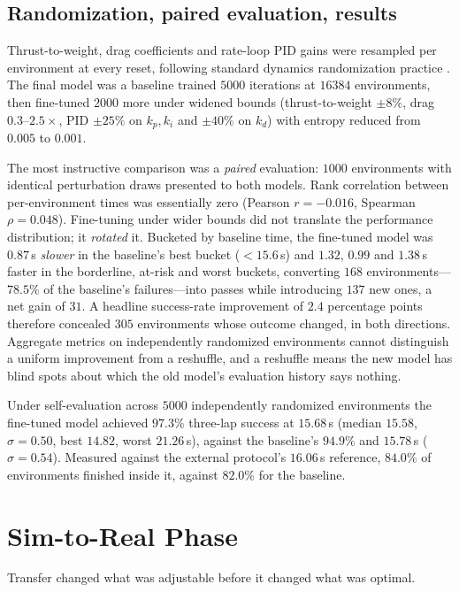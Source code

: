 \documentclass[10pt, twocolumn]{article}
\begin{document}
\subsection{Randomization, paired evaluation, results}

Thrust-to-weight, drag coefficients and rate-loop PID gains were resampled per
environment at every reset, following standard dynamics randomization practice
\cite{tobin2017,peng2018}. The final model was a baseline trained $5000$
iterations at $16384$ environments, then fine-tuned $2000$ more under widened
bounds (thrust-to-weight $\pm8\%$, drag $0.3$--$2.5\times$, PID $\pm25\%$ on
$k_p,k_i$ and $\pm40\%$ on $k_d$) with entropy reduced from $0.005$ to $0.001$.

The most instructive comparison was a \emph{paired} evaluation: $1000$
environments with identical perturbation draws presented to both models. Rank
correlation between per-environment times was essentially zero (Pearson
$r = -0.016$, Spearman $\rho = 0.048$). Fine-tuning under wider bounds did not
translate the performance distribution; it \emph{rotated} it. Bucketed by
baseline time, the fine-tuned model was $0.87$\,s \emph{slower} in the
baseline's best bucket ($<15.6$\,s) and $1.32$, $0.99$ and $1.38$\,s faster in
the borderline, at-risk and worst buckets, converting $168$
environments---$78.5\%$ of the baseline's failures---into passes while
introducing $137$ new ones, a net gain of $31$. A headline success-rate
improvement of $2.4$ percentage points therefore concealed $305$ environments
whose outcome changed, in both directions. Aggregate metrics on independently
randomized environments cannot distinguish a uniform improvement from a
reshuffle, and a reshuffle means the new model has blind spots about which the
old model's evaluation history says nothing.

Under self-evaluation across $5000$ independently randomized environments the
fine-tuned model achieved $97.3\%$ three-lap success at $15.68$\,s (median
$15.58$, $\sigma = 0.50$, best $14.82$, worst $21.26$\,s), against the
baseline's $94.9\%$ and $15.78$\,s ($\sigma = 0.54$). Measured against the
external protocol's $16.06$\,s reference, $84.0\%$ of environments finished
inside it, against $82.0\%$ for the baseline.

\section{Sim-to-Real Phase}

Transfer changed what was adjustable before it changed what was optimal.
\end{document}
